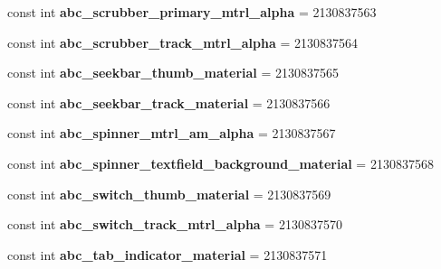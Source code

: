 \begin{DoxyCompactItemize}
const int {\bfseries abc\+\_\+scrubber\+\_\+primary\+\_\+mtrl\+\_\+alpha} = 2130837563
\item 
\mbox{\label{classXaria_1_1Resource_1_1Drawable_ac04e5dd3e8003d79d5c961c39bf990e2}} 
const int {\bfseries abc\+\_\+scrubber\+\_\+track\+\_\+mtrl\+\_\+alpha} = 2130837564
\item 
\mbox{\label{classXaria_1_1Resource_1_1Drawable_aa3e3c28ab3417ed83636646c3e083fb6}} 
const int {\bfseries abc\+\_\+seekbar\+\_\+thumb\+\_\+material} = 2130837565
\item 
\mbox{\label{classXaria_1_1Resource_1_1Drawable_a5dae30e201cf4fa2f91d1ab8415f23f4}} 
const int {\bfseries abc\+\_\+seekbar\+\_\+track\+\_\+material} = 2130837566
\item 
\mbox{\label{classXaria_1_1Resource_1_1Drawable_a7426f79d16fd0709da657ad43297f30a}} 
const int {\bfseries abc\+\_\+spinner\+\_\+mtrl\+\_\+am\+\_\+alpha} = 2130837567
\item 
\mbox{\label{classXaria_1_1Resource_1_1Drawable_acc757629c4a5f36e59d684ebc23cda5b}} 
const int {\bfseries abc\+\_\+spinner\+\_\+textfield\+\_\+background\+\_\+material} = 2130837568
\item 
\mbox{\label{classXaria_1_1Resource_1_1Drawable_aea0a7e11ba72bcc68d66d5f728f3a5d2}} 
const int {\bfseries abc\+\_\+switch\+\_\+thumb\+\_\+material} = 2130837569
\item 
\mbox{\label{classXaria_1_1Resource_1_1Drawable_ad3031f5572c9454ccb98401289eae55b}} 
const int {\bfseries abc\+\_\+switch\+\_\+track\+\_\+mtrl\+\_\+alpha} = 2130837570
\item 
\mbox{\label{classXaria_1_1Resource_1_1Drawable_a9154737ed89585c29e2ee77b5dee3013}} 
const int {\bfseries abc\+\_\+tab\+\_\+indicator\+\_\+material} = 2130837571
\item 
\mbox{\label{classXaria_1_1Resource_1_1Drawable_a1f6270c853263475fea7a94e9c9bdd91}} 

\end{DoxyCompactItemize}
